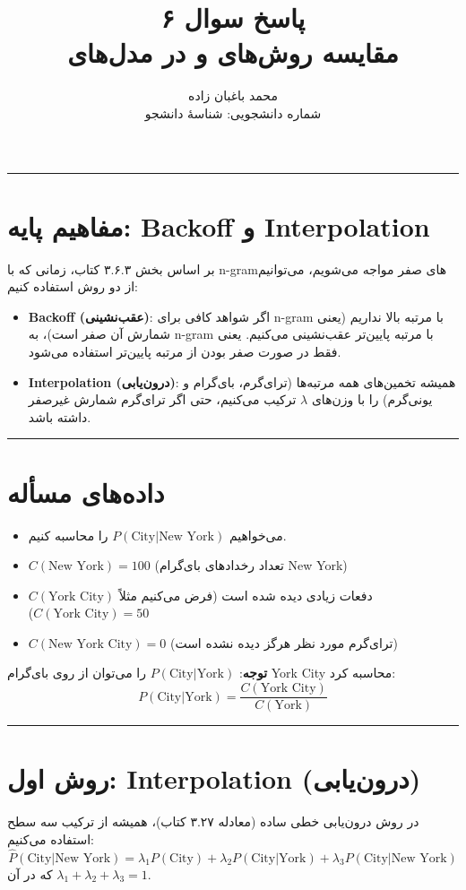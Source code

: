 \documentclass[11pt,a4paper]{article}
\title{\textbf{پاسخ سوال ۶} \\[0.4cm] \footnotesize مقایسه روش‌های \en{Interpolation} و \en{Backoff} در مدل‌های \en{Trigram}}
\author{محمد باغبان زاده \\ شماره دانشجویی: شناسهٔ دانشجو}
\date{}
\newcommand{\en}[1]{\textenglish{#1}}
\newcommand{\separator}{\vspace{1em}\noindent\rule{\linewidth}{0.4pt}\vspace{1em}}
\newcommand{\thickseparator}{\vspace{1em}\noindent\rule{\linewidth}{1pt}\vspace{1em}}
\begin{document}
\maketitle
\thickseparator

\section{مفاهیم پایه: \en{Backoff} و \en{Interpolation}}
بر اساس بخش ۳.۶.۳ کتاب، زمانی که با \en{n-gram}های صفر مواجه می‌شویم، می‌توانیم از دو روش استفاده کنیم:

\begin{itemize}
\item \textbf{\en{Backoff} (عقب‌نشینی)}: اگر شواهد کافی برای \en{n-gram} با مرتبه بالا نداریم (یعنی شمارش آن صفر است)، به \en{n-gram} با مرتبه پایین‌تر عقب‌نشینی می‌کنیم. یعنی فقط در صورت صفر بودن از مرتبه پایین‌تر استفاده می‌شود.

\item \textbf{\en{Interpolation} (درون‌یابی)}: همیشه تخمین‌های همه مرتبه‌ها (ترای‌گرم، بای‌گرام و یونی‌گرم) را با وزن‌های $\lambda$ ترکیب می‌کنیم، حتی اگر ترای‌گرم شمارش غیرصفر داشته باشد.
\end{itemize}

\separator
\section{داده‌های مسأله}
\begin{itemize}
\item می‌خواهیم $P(\text{City} | \text{New York})$ را محاسبه کنیم.
\item $C(\text{New York}) = 100$ (تعداد رخدادهای بای‌گرام \en{New York})
\item $C(\text{York City})$ دفعات زیادی دیده شده است (فرض می‌کنیم مثلاً $C(\text{York City}) = 50$)
\item $C(\text{New York City}) = 0$ (ترای‌گرم مورد نظر هرگز دیده نشده است)
\end{itemize}

\textbf{توجه}: $P(\text{City}|\text{York})$ را می‌توان از روی بای‌گرام \en{York City} محاسبه کرد:
\[
P(\text{City}|\text{York}) = \frac{C(\text{York City})}{C(\text{York})}
\]

\separator
\section{روش اول: \en{Interpolation} (درون‌یابی)}
در روش درون‌یابی خطی ساده (معادله ۳.۲۷ کتاب)، همیشه از ترکیب سه سطح استفاده می‌کنیم:
\[
\hat{P}(\text{City}|\text{New York}) = \lambda_1 P(\text{City}) + \lambda_2 P(\text{City}|\text{York}) + \lambda_3 P(\text{City}|\text{New York})
\]
که در آن $\lambda_1 + \lambda_2 + \lambda_3 = 1$.
\end{document}
